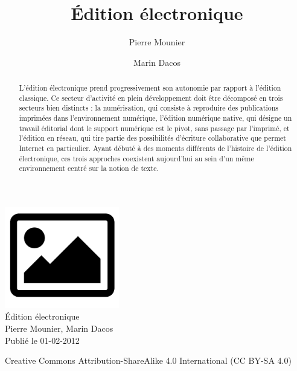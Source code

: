 \documentclass[12pt,french,letterpaper,]{article}
\title{Édition électronique}
\author{Pierre Mounier \and Marin Dacos}
\date{}
\newcommand{\fr}{\selectlanguage{french}}
\newcommand{\en}{\selectlanguage{english}}
\begin{document}
\fr
\thispagestyle{empty}
\begin{center}
\includegraphics[width=50mm]{media/logo.png}\\
\vspace*{1cm}
\Huge Édition électronique\\
\vspace*{1cm} \LARGE Pierre Mounier,  Marin Dacos
\\
\normalsize\vspace*{1cm}Publié le 01-02-2012\\
\vspace*{3cm}
\url{}
\end{center}


\begin{center}
Creative Commons Attribution-ShareAlike 4.0 International (CC BY-SA 4.0)
\end{center}


\newpage

\thispagestyle{empty}

\

\begin{abstract}

  L'édition électronique prend progressivement son autonomie par rapport à
  l'édition classique. Ce secteur d'activité en plein développement doit
  être décomposé en trois secteurs bien distincts : la numérisation, qui
  consiste à reproduire des publications imprimées dans l'environnement
  numérique, l'édition numérique native, qui désigne un travail éditorial
  dont le support numérique est le pivot, sans passage par l'imprimé, et
  l'édition en réseau, qui tire partie des possibilités d'écriture
  collaborative que permet Internet en particulier. Ayant débuté à des
  moments différents de l'histoire de l'édition électronique, ces trois
  approches coexistent aujourd'hui au sein d'un même environnement centré
  sur la notion de texte.
  \end{abstract}
  
  \en
  
\end{document}

